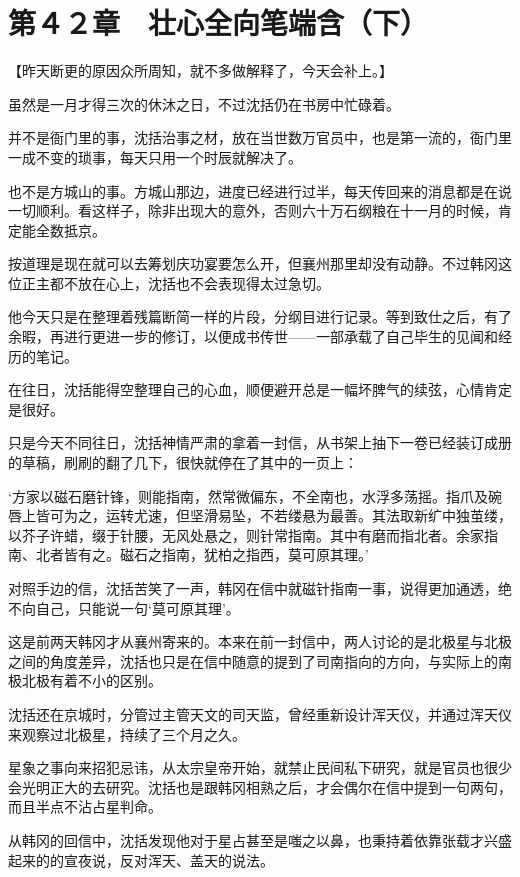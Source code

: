 \section{第４２章　壮心全向笔端含（下）}

【昨天断更的原因众所周知，就不多做解释了，今天会补上。】

虽然是一月才得三次的休沐之日，不过沈括仍在书房中忙碌着。

并不是衙门里的事，沈括治事之材，放在当世数万官员中，也是第一流的，衙门里一成不变的琐事，每天只用一个时辰就解决了。

也不是方城山的事。方城山那边，进度已经进行过半，每天传回来的消息都是在说一切顺利。看这样子，除非出现大的意外，否则六十万石纲粮在十一月的时候，肯定能全数抵京。

按道理是现在就可以去筹划庆功宴要怎么开，但襄州那里却没有动静。不过韩冈这位正主都不放在心上，沈括也不会表现得太过急切。

他今天只是在整理着残篇断简一样的片段，分纲目进行记录。等到致仕之后，有了余暇，再进行更进一步的修订，以便成书传世——一部承载了自己毕生的见闻和经历的笔记。

在往日，沈括能得空整理自己的心血，顺便避开总是一幅坏脾气的续弦，心情肯定是很好。

只是今天不同往日，沈括神情严肃的拿着一封信，从书架上抽下一卷已经装订成册的草稿，刷刷的翻了几下，很快就停在了其中的一页上：

‘方家以磁石磨针锋，则能指南，然常微偏东，不全南也，水浮多荡摇。指爪及碗唇上皆可为之，运转尤速，但坚滑易坠，不若缕悬为最善。其法取新纩中独茧缕，以芥子许蜡，缀于针腰，无风处悬之，则针常指南。其中有磨而指北者。余家指南、北者皆有之。磁石之指南，犹柏之指西，莫可原其理。’

对照手边的信，沈括苦笑了一声，韩冈在信中就磁针指南一事，说得更加通透，绝不向自己，只能说一句‘莫可原其理’。

这是前两天韩冈才从襄州寄来的。本来在前一封信中，两人讨论的是北极星与北极之间的角度差异，沈括也只是在信中随意的提到了司南指向的方向，与实际上的南极北极有着不小的区别。

沈括还在京城时，分管过主管天文的司天监，曾经重新设计浑天仪，并通过浑天仪来观察过北极星，持续了三个月之久。

星象之事向来招犯忌讳，从太宗皇帝开始，就禁止民间私下研究，就是官员也很少会光明正大的去研究。沈括也是跟韩冈相熟之后，才会偶尔在信中提到一句两句，而且半点不沾占星判命。

从韩冈的回信中，沈括发现他对于星占甚至是嗤之以鼻，也秉持着依靠张载才兴盛起来的的宣夜说，反对浑天、盖天的说法。

